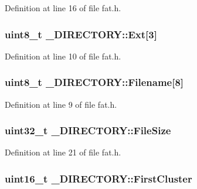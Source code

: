 Definition at line 16 of file fat.\+h.

\subsubsection[{\texorpdfstring{Ext}{Ext}}]{\setlength{\rightskip}{0pt plus 5cm}uint8\+\_\+t \+\_\+\+D\+I\+R\+E\+C\+T\+O\+R\+Y\+::\+Ext\mbox{[}3\mbox{]}}\hypertarget{struct__DIRECTORY_ac29a0cf993ecea88a7b7a4050be9b025}{}\label{struct__DIRECTORY_ac29a0cf993ecea88a7b7a4050be9b025}


Definition at line 10 of file fat.\+h.

\subsubsection[{\texorpdfstring{Filename}{Filename}}]{\setlength{\rightskip}{0pt plus 5cm}uint8\+\_\+t \+\_\+\+D\+I\+R\+E\+C\+T\+O\+R\+Y\+::\+Filename\mbox{[}8\mbox{]}}\hypertarget{struct__DIRECTORY_ab9950ebc3a840e0ad44f1aa3e2a05be6}{}\label{struct__DIRECTORY_ab9950ebc3a840e0ad44f1aa3e2a05be6}


Definition at line 9 of file fat.\+h.

\subsubsection[{\texorpdfstring{File\+Size}{FileSize}}]{\setlength{\rightskip}{0pt plus 5cm}uint32\+\_\+t \+\_\+\+D\+I\+R\+E\+C\+T\+O\+R\+Y\+::\+File\+Size}\hypertarget{struct__DIRECTORY_a7e15691413cbea31518a0d989de5ff0e}{}\label{struct__DIRECTORY_a7e15691413cbea31518a0d989de5ff0e}


Definition at line 21 of file fat.\+h.

\subsubsection[{\texorpdfstring{First\+Cluster}{FirstCluster}}]{\setlength{\rightskip}{0pt plus 5cm}uint16\+\_\+t \+\_\+\+D\+I\+R\+E\+C\+T\+O\+R\+Y\+::\+First\+Cluster}\hypertarget{struct__DIRECTORY_a587e8955f97e6b4bac5f0f0778e08a4f}{}\label{struct__DIRECTORY_a587e8955f97e6b4bac5f0f0778e08a4f}


